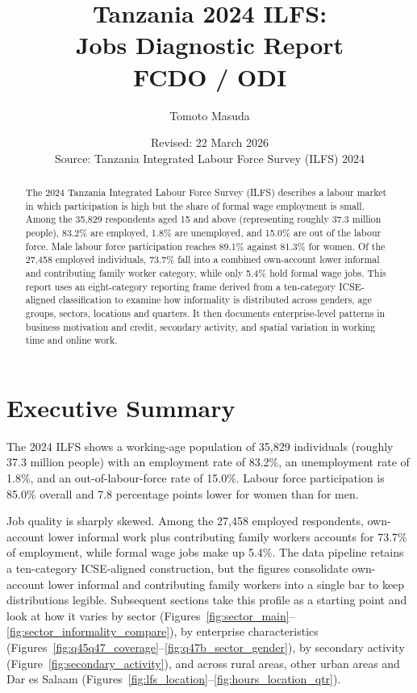 \documentclass[12pt,a4paper]{article}
\title{%
  \vspace{-1cm}
  \textbf{Tanzania 2024 ILFS:\\Jobs Diagnostic Report}\\[0.5em]
  \large FCDO / ODI
}
\author{Tomoto Masuda}
\date{Revised: 22 March 2026\\[0.3em]
\small Source: Tanzania Integrated Labour Force Survey (ILFS) 2024}
\begin{document}
\maketitle
\thispagestyle{fancy}

\begin{abstract}
The 2024 Tanzania Integrated Labour Force Survey (ILFS) describes a labour market in which participation is high but the share of formal wage employment is small. Among the 35,829 respondents aged 15 and above (representing roughly 37.3 million people), 83.2\% are employed, 1.8\% are unemployed, and 15.0\% are out of the labour force. Male labour force participation reaches 89.1\% against 81.3\% for women. Of the 27,458 employed individuals, 73.7\% fall into a combined own-account lower informal and contributing family worker category, while only 5.4\% hold formal wage jobs. This report uses an eight-category reporting frame derived from a ten-category ICSE-aligned classification to examine how informality is distributed across genders, age groups, sectors, locations and quarters. It then documents enterprise-level patterns in business motivation and credit, secondary activity, and spatial variation in working time and online work.
\end{abstract}

\newpage
\tableofcontents
\newpage

\section{Executive Summary}

The 2024 ILFS shows a working-age population of 35,829 individuals (roughly 37.3 million people) with an employment rate of 83.2\%, an unemployment rate of 1.8\%, and an out-of-labour-force rate of 15.0\%. Labour force participation is 85.0\% overall and 7.8 percentage points lower for women than for men.

Job quality is sharply skewed. Among the 27,458 employed respondents, own-account lower informal work plus contributing family workers accounts for 73.7\% of employment, while formal wage jobs make up 5.4\%. The data pipeline retains a ten-category ICSE-aligned construction, but the figures consolidate own-account lower informal and contributing family workers into a single bar to keep distributions legible. Subsequent sections take this profile as a starting point and look at how it varies by sector (Figures~\ref{fig:sector_main}--\ref{fig:sector_informality_compare}), by enterprise characteristics (Figures~\ref{fig:q45q47_coverage}--\ref{fig:q47b_sector_gender}), by secondary activity (Figure~\ref{fig:secondary_activity}), and across rural areas, other urban areas and Dar es Salaam (Figures~\ref{fig:lfs_location}--\ref{fig:hours_location_qtr}).
\end{document}
